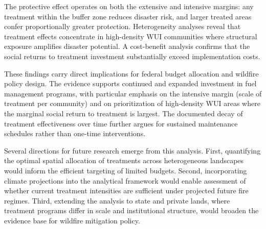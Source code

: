\documentclass[12pt, letterpaper]{article}
\begin{document}
The protective effect operates on both the extensive and intensive margins: any treatment within the buffer zone reduces disaster risk, and larger treated areas confer proportionally greater protection. Heterogeneity analyses reveal that treatment effects concentrate in high-density WUI communities where structural exposure amplifies disaster potential. A cost-benefit analysis confirms that the social returns to treatment investment substantially exceed implementation costs.

These findings carry direct implications for federal budget allocation and wildfire policy design. The evidence supports continued and expanded investment in fuel management programs, with particular emphasis on the intensive margin (scale of treatment per community) and on prioritization of high-density WUI areas where the marginal social return to treatment is largest. The documented decay of treatment effectiveness over time further argues for sustained maintenance schedules rather than one-time interventions.

Several directions for future research emerge from this analysis. First, quantifying the optimal spatial allocation of treatments across heterogeneous landscapes would inform the efficient targeting of limited budgets. Second, incorporating climate projections into the analytical framework would enable assessment of whether current treatment intensities are sufficient under projected future fire regimes. Third, extending the analysis to state and private lands, where treatment programs differ in scale and institutional structure, would broaden the evidence base for wildfire mitigation policy.
\end{document}
